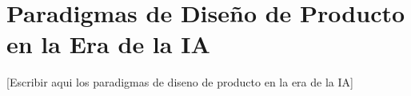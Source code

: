 
\section{Paradigmas de Diseño de Producto en la Era de la IA}

[Escribir aqui los paradigmas de diseno de producto en la era de la IA]
